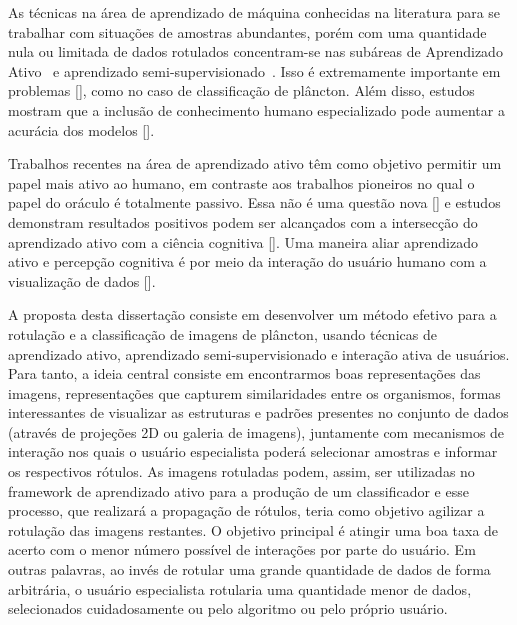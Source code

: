 As técnicas na área de aprendizado de máquina conhecidas na literatura para se trabalhar com situações de amostras abundantes, porém com uma quantidade nula ou limitada de dados rotulados concentram-se nas subáreas de Aprendizado Ativo~\cite{settles2014active} e aprendizado semi-supervisionado~\cite{}.   Isso é extremamente importante em problemas  [\cite{saito2014active}], como no caso de classificação de plâncton. Além disso, estudos mostram que a inclusão de conhecimento humano especializado pode aumentar a acurácia dos modelos [\cite{benfield2007rapid}].

Trabalhos recentes na área de aprendizado ativo têm como objetivo permitir um papel mais ativo ao humano, em contraste aos trabalhos pioneiros no qual o papel do oráculo é totalmente passivo. Essa não é uma questão nova [\cite{castro2009human, dasgupta2011two}] e estudos demonstram resultados positivos podem ser alcançados com a intersecção do aprendizado ativo com a ciência cognitiva [\cite{kottke2018other}]. Uma maneira aliar aprendizado ativo e percepção cognitiva é por meio da interação do usuário humano com a visualização de dados [\cite{yang2018visually, bernard2018comparing, weigl2016mapview}].  


A proposta desta dissertação consiste em desenvolver um método efetivo para a rotulação e a classificação de imagens de plâncton, usando técnicas de aprendizado ativo, aprendizado semi-supervisionado e interação ativa de usuários. Para tanto, a ideia central consiste em encontrarmos boas representações das imagens, representações que capturem similaridades entre os organismos, formas interessantes de visualizar as estruturas e padrões presentes no conjunto de dados (através de projeções 2D ou galeria de imagens), juntamente com mecanismos de interação nos quais o usuário especialista poderá selecionar amostras e informar os respectivos  rótulos. As imagens rotuladas podem, assim, ser utilizadas no framework de aprendizado ativo para a produção de um classificador e esse processo, que realizará a propagação de rótulos, teria como objetivo agilizar a rotulação das imagens restantes. O objetivo principal é atingir uma boa taxa de acerto com o menor número possível de interações por parte do usuário. Em outras palavras, ao invés de rotular uma grande quantidade de dados de forma arbitrária, o usuário especialista rotularia uma quantidade menor de dados, selecionados cuidadosamente ou pelo algoritmo ou pelo próprio usuário.

